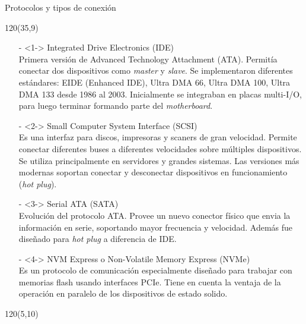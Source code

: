 \documentclass[aspectratio=169]{beamer}
\begin{document}
\begin{frame}{Protocolos y tipos de conexión}
    \begin{textblock}{120}(35,9)
    \small
    \begin{itemize}
    \item[-]<1-> \small \textcolor{naranjauca}{Integrated Drive Electronics (IDE)}\\ \footnotesize
    Primera versión de Advanced Technology Attachment (ATA). Permitía conectar dos dispositivos como \emph{master} y \emph{slave}.
    Se implementaron diferentes estándares: EIDE (Enhanced IDE), Ultra DMA 66, Ultra DMA 100, Ultra DMA 133 desde 1986 al 2003.
    Inicialmente se integraban en placas multi-I/O, para luego terminar formando parte del \emph{motherboard}.
    \item[-]<2-> \small \textcolor{naranjauca}{Small Computer System Interface (SCSI)}\\ \footnotesize
    Es una interfaz para discos, impresoras y scaners de gran velocidad. Permite conectar diferentes buses a diferentes velocidades sobre múltiples dispositivos.
    Se utiliza principalmente en servidores y grandes sistemas. Las versiones más modernas soportan conectar y desconectar dispositivos en funcionamiento (\emph{hot plug}).
    \item[-]<3-> \small \textcolor{naranjauca}{Serial ATA (SATA)}\\ \footnotesize
    Evolución del protocolo ATA. Provee un nuevo conector físico que envia la información en serie, soportando mayor frecuencia y velocidad.
    Además fue diseñado para \emph{hot plug} a diferencia de IDE.
    \item[-]<4-> \small \textcolor{naranjauca}{NVM Express o Non-Volatile Memory Express (NVMe)}\\ \footnotesize
    Es un protocolo de comunicación especialmente diseñado para trabajar con memorias flash usando interfaces PCIe.
    Tiene en cuenta la ventaja de la operación en paralelo de los dispositivos de estado solido.
    \end{itemize}
    \end{textblock}
    \begin{textblock}{120}(5,10)
     \\

\end{textblock}
\end{frame}
\end{document}
